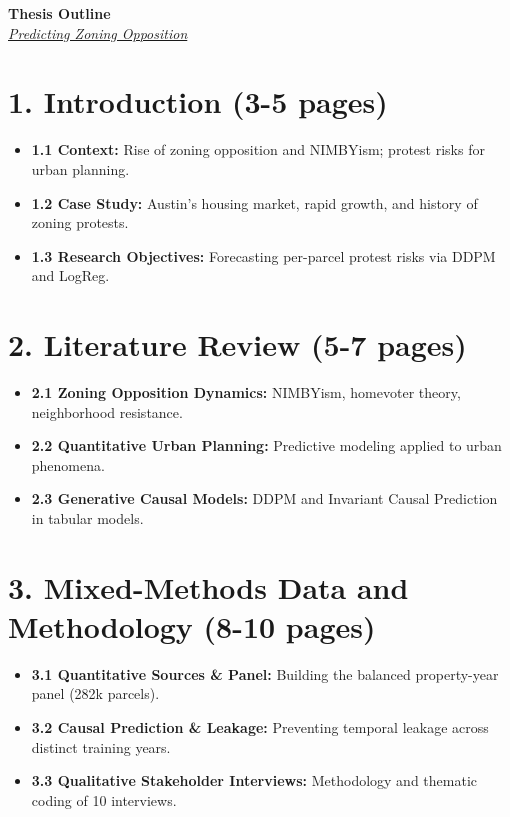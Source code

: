 \documentclass[11pt, letterpaper]{article}
\begin{document}
\pagestyle{fancy}

\vspace*{0.2cm}

\begin{center}
    {\Large \textbf{\color{columbiablue_official} Thesis Outline}} \\[0.4em]
    {\large \textit{\href{https://github.com/dhardestylewis/thesis}{Predicting Zoning Opposition}}}
\end{center}

\vspace{0.2cm}

\section*{1. Introduction (3-5 pages)}
\begin{itemize}[leftmargin=*, label={\color{columbiablue_official}\tiny$\square$}, parsep=2pt, itemsep=2pt, topsep=0pt]
    \item \textbf{1.1 Context:} Rise of zoning opposition and NIMBYism; protest risks for urban planning.
    \item \textbf{1.2 Case Study:} Austin's housing market, rapid growth, and history of zoning protests.
    \item \textbf{1.3 Research Objectives:} Forecasting per-parcel protest risks via DDPM and LogReg.
\end{itemize}

\section*{2. Literature Review (5-7 pages)}
\begin{itemize}[leftmargin=*, label={\color{columbiablue_official}\tiny$\square$}, parsep=2pt, itemsep=2pt, topsep=0pt]
    \item \textbf{2.1 Zoning Opposition Dynamics:} NIMBYism, homevoter theory, neighborhood resistance.
    \item \textbf{2.2 Quantitative Urban Planning:} Predictive modeling applied to urban phenomena.
    \item \textbf{2.3 Generative Causal Models:} DDPM and Invariant Causal Prediction in tabular models.
\end{itemize}

\section*{3. Mixed-Methods Data and Methodology (8-10 pages) \textcolor{columbiablue_official}{\checkmark}}
\begin{itemize}[leftmargin=*, label={\color{columbiablue_official}\tiny$\boxtimes$}, parsep=2pt, itemsep=2pt, topsep=0pt]
    \item \textbf{3.1 Quantitative Sources \& Panel:} Building the balanced property-year panel (282k parcels).
    \item \textbf{3.2 Causal Prediction \& Leakage:} Preventing temporal leakage across distinct training years.
    \item \textbf{3.3 Qualitative Stakeholder Interviews:} Methodology and thematic coding of 10 interviews.
\end{itemize}
\end{document}
